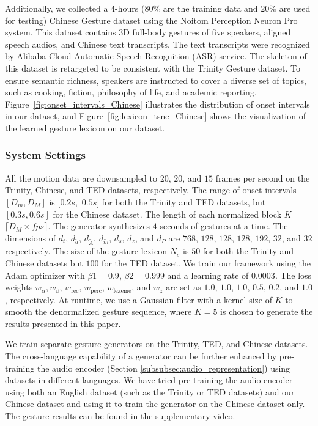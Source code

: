\documentclass[acmtog,authorversion]{acmart}
\newcommand{\eqword}[1]{{\text{#1}}}
\newcommand{\fig}{Figure{}~}
\begin{document}
Additionally, we collected a $4$-hours ($80\%$ are the training data and $20\%$ are used for testing) Chinese Gesture dataset using the Noitom Perception Neuron Pro system. This dataset contains 3D full-body gestures of five speakers, aligned speech audios, and Chinese text transcripts. The text transcripts were recognized by Alibaba Cloud Automatic Speech Recognition (ASR) service. The skeleton of this dataset is retargeted to be consistent with the Trinity Gesture dataset. To ensure semantic richness, speakers are instructed to cover a diverse set of topics, such as cooking, fiction, philosophy of life, and academic reporting. \fig\ref{fig:onset_intervals_Chinese} illustrates the distribution of onset intervals in our dataset, and \fig\ref{fig:lexicon_tsne_Chinese} shows the visualization of the learned gesture lexicon on our dataset.

\subsubsection{System Settings}
All the motion data are downsampled to $20$, $20$, and $15$ frames per second on the Trinity, Chinese, and TED datasets, respectively. The range of onset intervals $[D_m, D_M]$ is $[0.2s,$ $0.5s]$ for both the Trinity and TED datasets, but $[0.3s, 0.6s]$ for the Chinese dataset. The length of each normalized block $K$ $=$ $\lceil D_M\times{}fps \rceil$. The generator synthesizes $4$ seconds of gestures at a time. The dimensions of $d_t$, $d_{\tilde{a}}$, $d_{\tilde{A}}$, $d_{\tilde{m}}$, $d_s$, $d_z$, and $d_{P}$ are $768$, $128$, $128$, $128$, $192$, $32$, and $32$ respectively. The size of the gesture lexicon $N_s$ is $50$ for both the Trinity and Chinese datasets but $100$ for the TED dataset. We train our framework using the Adam optimizer with $\beta1 = 0.9$, $\beta2 = 0.999$ and a learning rate of $0.0003$. The loss weights $w_{\alpha}, w_{\beta}$, $w_{\eqword{rec}}$, $w_{\eqword{perc}}$, $w_{\eqword{lexeme}}$, and $w_{{z}}$ are set as $1.0$, $1.0$, $1.0$, $0.5$, $0.2$, and $1.0$, respectively. At runtime, we use a Gaussian filter with a kernel size of $K$ to smooth the denormalized gesture sequence, where $K=5$ is chosen to generate the results presented in this paper.

We train separate gesture generators on the Trinity, TED, and Chinese datasets. The cross-language capability of a generator can be further enhanced by pre-training the audio encoder (Section \ref{subsubsec:audio_representation}) using datasets in different languages. We have tried pre-training the audio encoder using both an English dataset (such as the Trinity or TED datasets) and our Chinese dataset and using it to train the generator on the Chinese dataset only. The gesture results can be found in the supplementary video.
\end{document}
